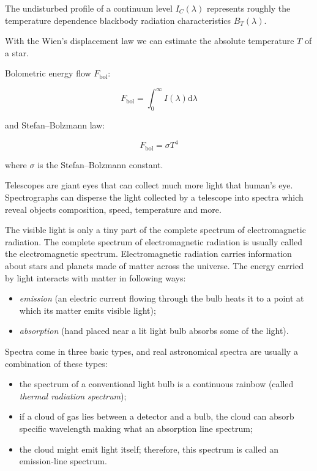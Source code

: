 The undisturbed profile of a continuum level \(I_C(\lambda)\) represents roughly the temperature dependence blackbody radiation characteristics \(B_T(\lambda)\).

With the Wien's displacement law we can estimate the absolute temperature \(T\) of a star.

Bolometric energy flow \(F_{\mathrm{bol}}\):

\begin{equation}
	F_{\mathrm{bol}} = \int_0^{\infty} I(\lambda) \mathrm{d} \lambda
\end{equation}

and Stefan--Bolzmann law:

\begin{equation}
	F_{\mathrm{bol}} = \sigma T^4
\end{equation}

where \(\sigma\) is the Stefan--Bolzmann constant.~\cite{trypsteen2017}

Telescopes are giant eyes that can collect much more light that human's eye.
Spectrographs can disperse the light collected by a telescope into spectra
which reveal objects composition, speed, temperature and more.~\cite{bennett2005}

The visible light is only a tiny part of the complete spectrum of electromagnetic radiation.
The complete spectrum of electromagnetic radiation is usually called the electromagnetic spectrum.
Electromagnetic radiation carries information about stars and planets made of matter across the universe.
The energy carried by light interacts with matter in following ways:

\begin{itemize}
	\item \textit{emission} (an electric current flowing through the bulb heats it to a point at
		which its matter emits visible light);
	\item \textit{absorption} (hand placed near a lit light bulb absorbs some of the light).
\end{itemize}

Spectra come in three basic types, and real astronomical spectra are usually a combination of these types:

\begin{itemize}
	\item the spectrum of a conventional light bulb is a continuous rainbow (called \textit{thermal radiation spectrum});
	\item if a cloud of gas lies between a detector and a bulb,
		the cloud can absorb specific wavelength making what an absorption line spectrum;
	\item the cloud might emit light itself; therefore, this spectrum is called an emission-line spectrum.
\end{itemize}

